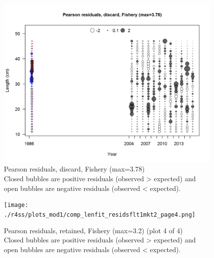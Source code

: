 \documentclass[12pt,]{article}
\begin{document}
\begin{figure}
\centering
\includegraphics{./r4ss/plots_mod1/comp_lenfit_residsflt1mkt1.png}
\caption{Pearson residuals, discard, Fishery (max=3.78)\\
Closed bubbles are positive residuals (observed \textgreater{} expected)
and open bubbles are negative residuals (observed \textless{} expected).
\label{fig:discard_len_pearson}}
\end{figure}

\begin{figure}
\centering
\texttt{[image: ./r4ss/plots\_mod1/comp\_lenfit\_residsflt1mkt2\_page4.png]}
\caption{Pearson residuals, retained, Fishery (max=3.2) (plot 4 of 4)\\
Closed bubbles are positive residuals (observed \textgreater{} expected)
and open bubbles are negative residuals (observed \textless{} expected).
\label{fig:fishery_len_pearson}}
\end{figure}
\end{document}
